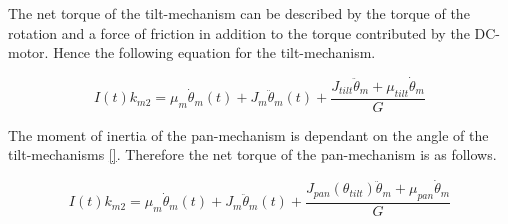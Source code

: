 The net torque of the tilt-mechanism can be described by the torque of the rotation and a force of friction in addition to the torque contributed by the DC-motor. Hence the following equation for the tilt-mechanism.

\begin{equation}
    I(t)k_{m2} = \mu_m\dot{\theta}_m(t) + J_m\ddot{\theta}_m(t) + \frac{J_{tilt}\ddot{\theta}_m + \mu_{tilt}\dot{\theta}_m}{G}
\end{equation}

The moment of inertia of the pan-mechanism is dependant on the angle of the tilt-mechanisms \ref{}. Therefore the net torque of the pan-mechanism is as follows.

\begin{equation}
    I(t)k_{m2} = \mu_m\dot{\theta}_m(t) + J_m\ddot{\theta}_m(t) + \frac{J_{pan}(\theta_{tilt})\ddot{\theta}_m + \mu_{pan}\dot{\theta}_m}{G}
\end{equation}

